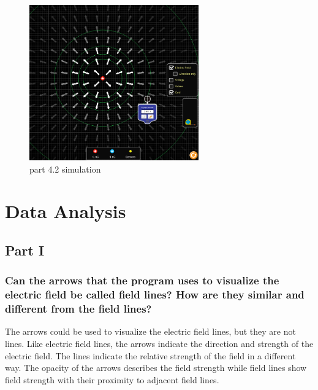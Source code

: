 \documentclass{article}
\begin{document}
\begin{figure}[H]
	\begin{center}
		\includegraphics[width=0.65\textwidth]{part-4.2-simulation} %
		\caption{part 4.2 simulation}
	\end{center}
\end{figure}





\section{Data Analysis}

\subsection{Part I}%
\label{sub:part_one}

\subsubsection{\textbf{Can the arrows that the program uses to visualize the electric field be called field lines? How are they similar and different from the field lines?}}
\label{ssub:}

The arrows could be used to visualize the electric field lines, but they are not lines.
Like electric field lines, the arrows indicate the direction and strength of the electric field.
The lines indicate the relative strength of the field in a different way. The opacity of the arrows
describes the field strength while field lines show field strength with their proximity to adjacent field lines.
\end{document}
